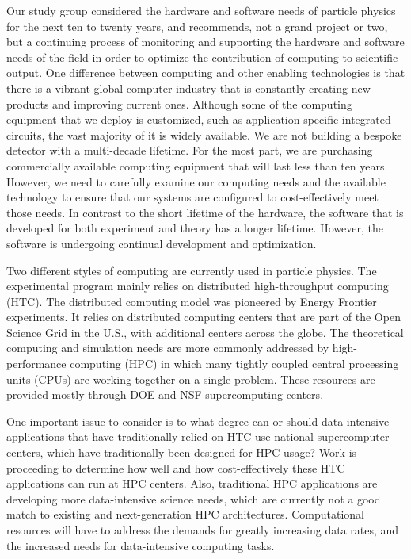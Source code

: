 Our study group
considered the hardware and software needs of particle physics for the next
ten to twenty years, and recommends, not a grand project or two, but a continuing
process of monitoring and supporting the hardware and software needs of the field
in order to optimize the contribution of computing to scientific output.
One difference between computing and other enabling technologies is that there is
a vibrant global computer industry that is constantly creating new products
and improving current ones.  Although some of the computing equipment that we deploy
is customized, such as application-specific integrated circuits, the vast
majority of it is widely available.  We are not building a bespoke detector with
a multi-decade lifetime.  For the most part, we are purchasing commercially available
computing equipment that will last less than ten years.  However, we need to
carefully examine our computing needs and the available technology
to ensure that our systems are configured to cost-effectively meet those needs.
In contrast to the short lifetime of the hardware, the
software that is developed for both experiment and theory has a longer lifetime. 
However, the software is undergoing continual development and optimization.   

Two different styles of computing are currently used in particle physics.
The experimental program mainly relies on distributed
high-throughput computing (HTC). 
The distributed computing model was pioneered by Energy Frontier
experiments.  It relies on distributed computing
centers that are part of the Open Science Grid in the U.S.,
with additional centers across the globe. 
The theoretical computing and simulation needs are more commonly
addressed by high-performance computing (HPC) in which many
tightly coupled central processing units (CPUs) are working together on a single
problem. These resources are provided mostly through DOE and NSF
supercomputing centers.

One important issue to consider is 
to what degree can or should data-intensive applications that have traditionally 
relied on HTC use national supercomputer centers, which have traditionally 
been designed for HPC usage?
Work is proceeding to determine how well and how cost-effectively these HTC
applications can run at HPC centers.
Also, traditional HPC applications are developing more data-intensive
science needs, which are currently not a good match to existing
and next-generation HPC architectures. Computational resources will have to
address the demands for greatly increasing data rates, and the increased
needs for data-intensive computing tasks.

